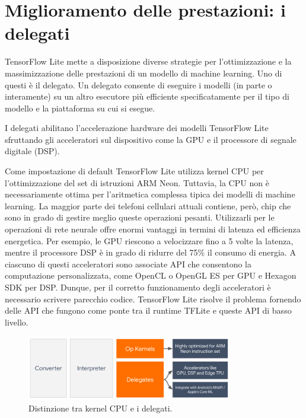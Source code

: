 \section{Miglioramento delle prestazioni: i delegati}
TensorFlow Lite mette a disposizione diverse strategie per l’ottimizzazione e la massimizzazione delle prestazioni di un modello di machine learning.
Uno di questi è il delegato. Un delegato consente di eseguire i modelli (in parte o interamente) su un altro esecutore più efficiente specificatamente
per il tipo di modello e la piattaforma su cui si esegue.                                                                                                                                       

I delegati abilitano l'accelerazione hardware dei modelli TensorFlow Lite sfruttando gli acceleratori sul dispositivo come la GPU e il processore di
segnale digitale (DSP).

Come impostazione di default TensorFlow Lite utilizza kernel CPU per l’ottimizzazione del set di istruzioni ARM Neon. Tuttavia, la CPU non è
necessariamente ottima per l'aritmetica complessa tipica dei modelli di machine learning. La maggior parte dei telefoni cellulari attuali contiene,
però, chip che sono in grado di gestire meglio queste operazioni pesanti. Utilizzarli per le operazioni di rete neurale offre enormi vantaggi in termini
di latenza ed efficienza energetica. Per esempio, le GPU riescono a velocizzare fino a 5 volte la latenza, mentre il processore DSP è in grado di ridurre
del 75\% il consumo di energia. A ciascuno di questi acceleratori sono associate API che consentono la computazione personalizzata, come OpenCL o OpenGL
ES per GPU e Hexagon SDK per DSP. Dunque, per il corretto funzionamento degli acceleratori è necessario scrivere parecchio codice. TensorFlow Lite risolve
il problema fornendo delle API che fungono come ponte tra il runtime TFLite e queste API di basso livello.

\begin{figure}[ht]
    \centering
    \includegraphics[width=0.8\textwidth]{Immagini/delegate_runtime.png}
    \caption{Distinzione tra kernel CPU e i delegati.}
    \label{fig:distinzione}
\end{figure}

